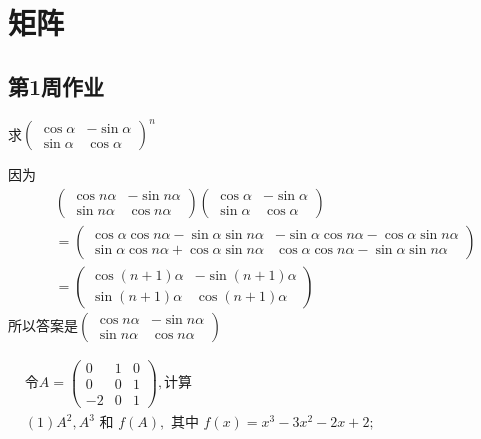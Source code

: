 \chapter{矩阵}
\section{第1周作业}
\begin{example}{}{}
    求$\left( \begin{matrix} \cos \alpha&- \sin \alpha \\ \sin \alpha& \cos \alpha \end{matrix} \right)^{n}$
\end{example}
\begin{solution}
    因为\begin{align*}&\left( \begin{matrix} \cos n\alpha&- \sin n\alpha \\ \sin n\alpha& \cos n\alpha \end{matrix} \right)\left( \begin{matrix} \cos \alpha&- \sin \alpha \\ \sin \alpha& \cos \alpha \end{matrix} \right)\\&=\left( \begin{matrix} \cos\alpha\cos n\alpha-\sin \alpha\sin n\alpha &-\sin\alpha\cos n\alpha-\cos\alpha\sin n\alpha \\ \sin\alpha\cos n\alpha+\cos\alpha\sin n\alpha& \cos\alpha\cos n\alpha-\sin \alpha\sin n\alpha \end{matrix} \right)\\&=\left( \begin{matrix} \cos (n+1)\alpha&- \sin (n+1)\alpha \\ \sin (n+1)\alpha& \cos (n+1)\alpha \end{matrix} \right)\end{align*}所以答案是$\left( \begin{matrix} \cos n\alpha&- \sin n\alpha \\ \sin n\alpha& \cos n\alpha \end{matrix} \right)$
\end{solution}
\begin{example}{}{}
    $\begin{aligned}&\text{令}A=\begin{pmatrix}0&1&0\\0&0&1\\-2&0&1\end{pmatrix},\text{计算}\\&(1)A^2,A^3\text{ 和 }f(A),\text{ 其中 }f(x)=x^3-3x^2-2x+2;\end{aligned}$
\end{example}
